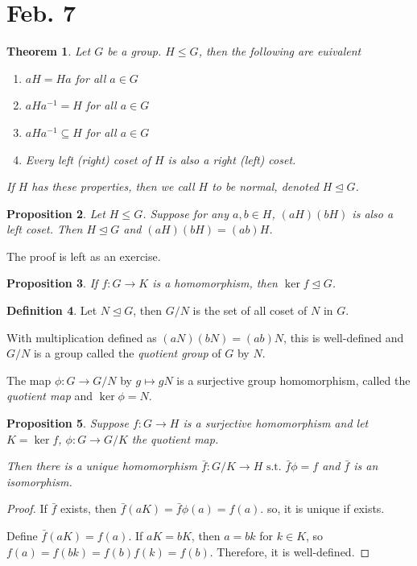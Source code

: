 \documentclass{amsart}
\newtheorem{thm}{Theorem}[section]
\newtheorem{prop}[thm]{Proposition}
\theoremstyle{definition}
\newtheorem{definition}[thm]{Definition}
\newcommand{\st}{\text{ s.t. }}
\begin{document}
\section{Feb. 7}
\begin{thm}
Let $G$ be a group. $H\leq G$, then the following are euivalent
\begin{enumerate}
	\item $aH=Ha$ for all $a\in G$
	\item $aHa^{-1}=H$ for all $a\in G$
	\item $aHa^{-1}\subseteq H$ for all $a\in G$
	\item Every left (right) coset of $H$ is also a right (left) coset.
\end{enumerate}
If $H$ has these properties, then we call $H$ to be normal, denoted $H\unlhd G$.
\end{thm}
\begin{prop}
Let $H\leq G$. Suppose for any $a,b\in H$, $(aH)(bH)$ is also a left coset. Then $H\unlhd G$ and $(aH)(bH)=(ab)H$.	
\end{prop}
The proof is left as an exercise.
\begin{prop}
If $f:G\to K$ is a homomorphism, then $\ker f\unlhd G$.	
\end{prop}
\begin{definition}
	Let $N\unlhd G$, then $G/N$ is the set of all coset of $N$ in $G$.
	
	With multiplication defined as $(aN)(bN)=(ab)N$, this is well-defined and $G/N$ is a group called the \emph{quotient group} of $G$ by $N$.
	
	The map $\phi:G\to G/N$ by $g\mapsto gN$ is a surjective group homomorphism, called the \emph{quotient map} and $\ker\phi=N$.
\end{definition}
\begin{prop}
	Suppose $f:G\to H$ is a surjective homomorphism and let $K=\ker f$, $\phi:G\to G/K$ the quotient map.
	
	Then there is a unique homomorphism $\bar f:G/K\to H\st \bar f\phi=f$ and $\bar f$ is an isomorphism. 
\end{prop}
\begin{proof}
	If $\bar f$ exists, then $\bar f(aK)=\bar f\phi (a)=f(a)$. so, it is unique if exists.
	
	Define $\bar f(aK)=f(a)$. If $aK=bK$, then $a=bk$ for $k\in K$, so $f(a)=f(bk)=f(b)f(k)=f(b)$. Therefore, it is well-defined.	
\end{proof}
\end{document}
